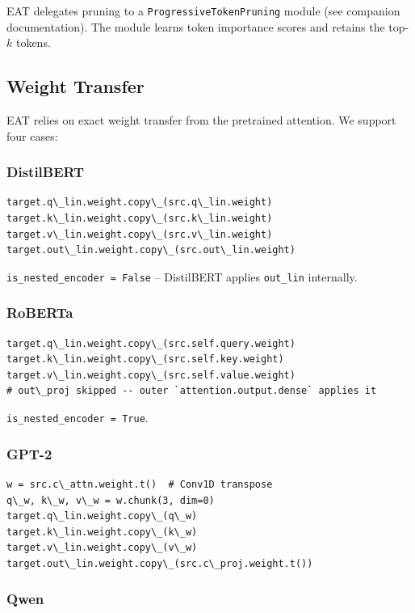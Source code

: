 EAT delegates pruning to a \texttt{ProgressiveTokenPruning} module (see companion 
documentation). The module learns token importance scores and retains the 
top-$k$ tokens.

\subsection{Weight Transfer}

EAT relies on exact weight transfer from the pretrained attention. We 
support four cases:

\subsubsection{DistilBERT}

\begin{lstlisting}
target.q\_lin.weight.copy\_(src.q\_lin.weight)
target.k\_lin.weight.copy\_(src.k\_lin.weight)
target.v\_lin.weight.copy\_(src.v\_lin.weight)
target.out\_lin.weight.copy\_(src.out\_lin.weight)
\end{lstlisting}

\texttt{is\_nested\_encoder = False} -- DistilBERT applies \texttt{out\_lin} internally.

\subsubsection{RoBERTa}

\begin{lstlisting}
target.q\_lin.weight.copy\_(src.self.query.weight)
target.k\_lin.weight.copy\_(src.self.key.weight)
target.v\_lin.weight.copy\_(src.self.value.weight)
# out\_proj skipped -- outer `attention.output.dense` applies it
\end{lstlisting}

\texttt{is\_nested\_encoder = True}.

\subsubsection{GPT-2}

\begin{lstlisting}
w = src.c\_attn.weight.t()  # Conv1D transpose
q\_w, k\_w, v\_w = w.chunk(3, dim=0)
target.q\_lin.weight.copy\_(q\_w)
target.k\_lin.weight.copy\_(k\_w)
target.v\_lin.weight.copy\_(v\_w)
target.out\_lin.weight.copy\_(src.c\_proj.weight.t())
\end{lstlisting}

\subsubsection{Qwen}

